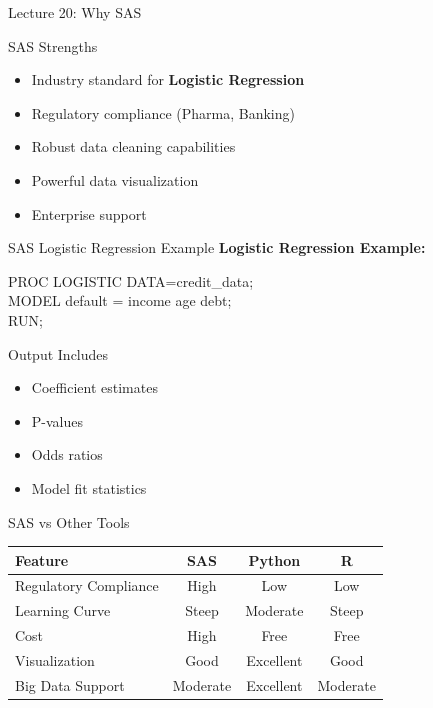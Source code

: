 \documentclass{beamer}
\begin{document}
	\begin{frame}{Lecture 20: Why SAS}
		\begin{block}{SAS Strengths}
			\begin{itemize}
				\item Industry standard for \textbf{Logistic Regression}
				\item Regulatory compliance (Pharma, Banking)
				\item Robust data cleaning capabilities
				\item Powerful data visualization
				\item Enterprise support
			\end{itemize}
		\end{block}
	\end{frame}
	
	\begin{frame}{SAS Logistic Regression Example}
		\textbf{Logistic Regression Example:}
		\begin{center}
			\color{blue}
			PROC LOGISTIC DATA=credit\_data;\\
			MODEL default = income age debt;\\
			RUN;
			\color{black}
		\end{center}
		
		\begin{example}{Output Includes}
			\begin{itemize}
				\item Coefficient estimates
				\item P-values
				\item Odds ratios
				\item Model fit statistics
			\end{itemize}
		\end{example}
	\end{frame}
	
	\begin{frame}{SAS vs Other Tools}
		\begin{table}
			\small
			\begin{tabular}{|l|c|c|c|}
				\hline
				\textbf{Feature} & \textbf{SAS} & \textbf{Python} & \textbf{R} \\
				\hline
				Regulatory Compliance & High & Low & Low \\
				\hline
				Learning Curve & Steep & Moderate & Steep \\
				\hline
				Cost & High & Free & Free \\
				\hline
				Visualization & Good & Excellent & Good \\
				\hline
				Big Data Support & Moderate & Excellent & Moderate \\
				\hline
			\end{tabular}
		\end{table}
	\end{frame}
	
\end{document}
